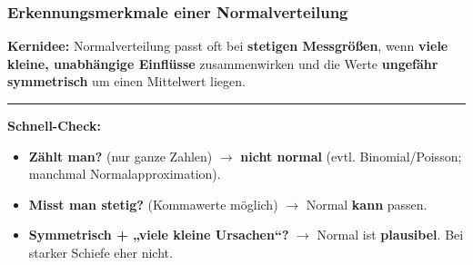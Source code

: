 \subsubsection{Erkennungsmerkmale einer Normalverteilung}
\textbf{Kernidee:} Normalverteilung passt oft bei \textbf{stetigen Messgrößen}, wenn \textbf{viele kleine, unabhängige Einflüsse} zusammenwirken und die Werte \textbf{ungefähr symmetrisch} um einen Mittelwert liegen.

\vspace{0.8em}
\hrule
\vspace{0.8em}
\textbf{Schnell-Check:}
\begin{itemize}
\item \textbf{Zählt man?} (nur ganze Zahlen) \(\rightarrow\) \textbf{nicht normal} (evtl. Binomial/Poisson; manchmal Normalapproximation).
\item \textbf{Misst man stetig?} (Kommawerte möglich) \(\rightarrow\) Normal \textbf{kann} passen.
\item \textbf{Symmetrisch + „viele kleine Ursachen“?} \(\rightarrow\) Normal ist \textbf{plausibel}. Bei starker Schiefe eher nicht.
\end{itemize}
